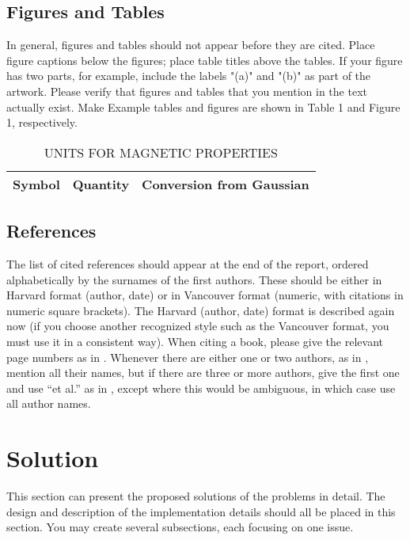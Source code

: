 \documentclass[11pt,a4paper]{article}
\begin{document}
\subsection{Figures and Tables}
In general, figures and tables should not appear before they are cited. Place figure captions below the figures; place table titles above the tables. If your figure has two parts, for example, include the labels "(a)" and "(b)" as part of the artwork. Please verify that figures and tables that you mention in the text actually exist. Make Example tables and figures are shown in Table 1 and Figure 1, respectively.

\begin{table}[htb]
\centering
\caption{UNITS FOR MAGNETIC PROPERTIES}
\vspace*{6pt}
\label{units}
\begin{tabular}{ccc}\hline\hline
Symbol & Quantity & Conversion from Gaussian \\ \hline
\end{tabular}
\end{table}

\subsection{References}

The list of cited references should appear at the end of the report, ordered alphabetically by the surnames of the first authors. These should be either in Harvard format (author, date) or in Vancouver format (numeric, with citations in numeric square brackets). The Harvard (author, date) format is described again now (if you choose another recognized style such as the Vancouver format, you must use it in a consistent way). When citing a book, please give the relevant page numbers as in \cite[pages 293-305]{Golumbic04}.  Whenever there are either one or two authors, as in \cite{mertziosspirakis13}, mention all their names, but if there are three or more authors, give the first one and use ``et al.'' as in \cite{mertzios2019temporal,enright2019deleting}, except where this would be ambiguous, in which case use all author names.






\section{Solution}

This section can present the proposed solutions of the problems in detail. The design and description of the implementation details should all be placed in this section. You may create several subsections, each focusing on one issue.
\end{document}
